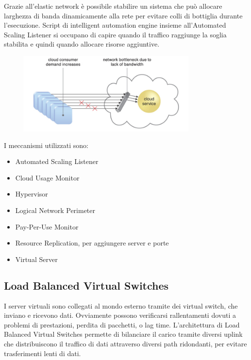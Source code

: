 Grazie all'elastic network è possibile stabilire un sistema che può allocare larghezza di banda dinamicamente alla rete per evitare colli di bottiglia durante l'esecuzione. Script di intelligent automation engine insieme all'Automated Scaling Listener si occupano di capire quando il traffico raggiunge la soglia stabilita e quindi quando allocare risorse aggiuntive.

\begin{figure}[htb!]
    \centering
    \includegraphics[width=9cm]{./Images/cap13/13.7.png}
\end{figure}

I meccanismi utilizzati sono:
\begin{itemize}
    \item Automated Scaling Listener
    \item Cloud Usage Monitor
    \item Hypervisor
    \item Logical Network Perimeter
    \item Pay-Per-Use Monitor
    \item Resource Replication, per aggiungere server e porte
    \item Virtual Server
\end{itemize}

\subsection{Load Balanced Virtual Switches}
I server virtuali sono collegati al mondo esterno tramite dei virtual switch, che inviano e ricevono dati. Ovviamente possono verificarsi rallentamenti dovuti a problemi di prestazioni, perdita di pacchetti, o lag time. L'architettura di Load Balanced Virtual Switches permette di bilanciare il carico tramite diversi uplink che distribuiscono il traffico di dati attraverso diversi path ridondanti, per evitare trasferimenti lenti di dati.

